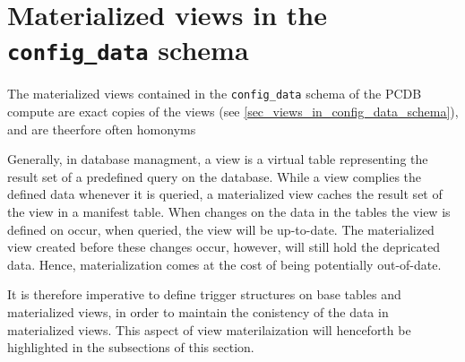 \section{Materialized views in the \texttt{config\_data} schema}\label{sec_mviews_in_config_data_schema}

The materialized views contained in the \texttt{config\_data} schema of the PCDB compute are exact copies of the views (see \ref{sec_views_in_config_data_schema}), and are theerfore often homonyms

Generally, in database managment, a view is a virtual table representing the result set of a predefined query on the database.%
While a view complies the defined data whenever it is queried, a materialized view caches the result set of the view in a manifest table.
When changes on the data in the tables the view is defined on occur, when queried, the view will be up-to-date.
The materialized view created before these changes occur, however, will still hold the depricated data.
Hence, materialization comes at the cost of being potentially out-of-date.

It is therefore imperative to define trigger structures on base tables and materialized views, in order to maintain the conistency of the data in materialized views.
This aspect of view materilaization will henceforth be highlighted in the subsections of this section.


      
      
% 

